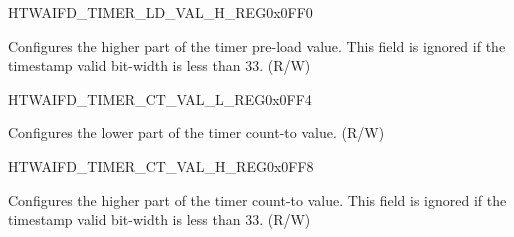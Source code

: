 \begin{register}{H}{TWAIFD\_TIMER\_LD\_VAL\_H\_REG}{0x0FF0}\label{regdesc:TWAIFDTIMERLDVALHREG}
%
\regnewline%
\begin{regdesc}\begin{reglist}
\label{fielddesc:TWAIFDTIMERLDVALH}\item [TWAIFD\_TIMER\_LD\_VAL\_H] Configures the higher part of the timer pre-load value. This field is ignored if the timestamp valid bit-width is less than 33. (R/W)
\end{reglist}\end{regdesc}
\end{register}


\begin{register}{H}{TWAIFD\_TIMER\_CT\_VAL\_L\_REG}{0x0FF4}\label{regdesc:TWAIFDTIMERCTVALLREG}
%
\regnewline%
\begin{regdesc}\begin{reglist}
\label{fielddesc:TWAIFDTIMERCTVALL}\item [TWAIFD\_TIMER\_CT\_VAL\_L] Configures the lower part of the timer count-to value. (R/W)
\end{reglist}\end{regdesc}
\end{register}


\begin{register}{H}{TWAIFD\_TIMER\_CT\_VAL\_H\_REG}{0x0FF8}\label{regdesc:TWAIFDTIMERCTVALHREG}
%
\regnewline%
\begin{regdesc}\begin{reglist}
\label{fielddesc:TWAIFDTIMERCTVALH}\item [TWAIFD\_TIMER\_CT\_VAL\_H] Configures the higher part of the timer count-to value. This field is ignored if the timestamp valid bit-width is less than 33. (R/W)
\end{reglist}\end{regdesc}
\end{register}


